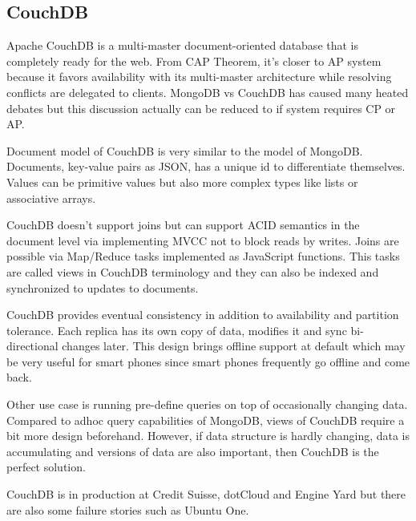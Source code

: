 \subsection{CouchDB}

Apache CouchDB is a multi-master document-oriented database that is completely ready for the web. From CAP Theorem, it's closer to AP system because it favors availability with its multi-master architecture while resolving conflicts are delegated to clients. MongoDB vs CouchDB has caused many heated debates but this discussion actually can be reduced to if system requires CP or AP.

Document model of CouchDB is very similar to the model of MongoDB. Documents, key-value pairs as JSON, has a unique id to differentiate themselves. Values can be primitive values but also more complex types like lists or associative arrays.

CouchDB doesn't support joins but can support ACID semantics in the document level via implementing MVCC not to block reads by writes. Joins are possible via Map/Reduce tasks implemented as JavaScript functions. This tasks are called views in CouchDB terminology and they can also be indexed and synchronized to updates to documents.

CouchDB provides eventual consistency in addition to availability and partition tolerance. Each replica has its own copy of data, modifies it and sync bi-directional changes later. This design brings offline support at default which may be very useful for smart phones since smart phones frequently go offline and come back.

Other use case is running pre-define queries on top of occasionally changing data. Compared to adhoc query capabilities of MongoDB, views of CouchDB require a bit more design beforehand. However, if data structure is hardly changing, data is accumulating and versions of data are also important, then CouchDB is the perfect solution.

CouchDB is in production at Credit Suisse, dotCloud and Engine Yard but there are also some failure stories such as Ubuntu One.

